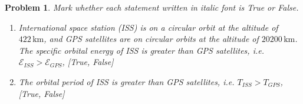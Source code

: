 \documentclass[10pt]{article}
\theoremstyle{plain}\theorembodyfont{\normalfont}
\newtheorem{prob}{Problem}[section]
\renewcommand{\theprob}{\arabic{prob}}
\newenvironment{subprob}%
{\renewcommand{\theenumi}{\alph{enumi}}\renewcommand{\labelenumi}{(\theenumi)}\begin{enumerate}}%
{\end{enumerate}}%
\begin{document}
\renewcommand{\theprob}{\arabic{prob} \textit{(15pt)}}
\begin{prob}
Mark whether each statement written in \textit{italic font} is True or False.
\begin{subprob}


%
%
%
%
%
%
%
%

\item International space station (ISS) is on a circular orbit at the altitude of $422\,\mathrm{km}$, and GPS satellites are on circular orbits at the altitude of $20200\,\mathrm{km}$. \textit{The specific orbital energy of ISS is greater than GPS satellites, i.e. $\mathcal{E}_{ISS} > \mathcal{E}_{GPS}$}, [True, False]

\vspace*{1cm}

\item \textit{The orbital period of ISS is greater than GPS satellites, i.e. $T_{ISS} > T_{GPS}$}, [True, False]

\vspace*{1cm}


\end{subprob}
\end{prob}
\end{document}
